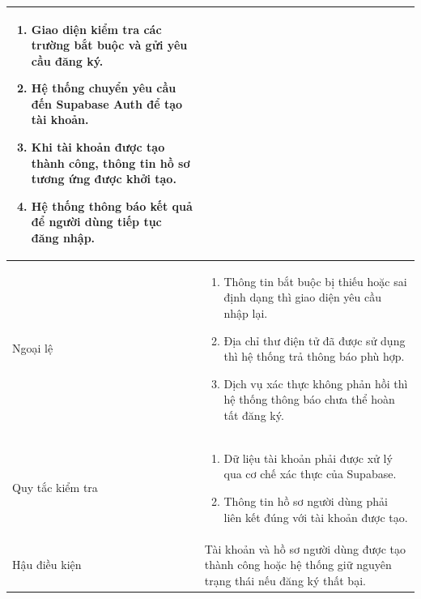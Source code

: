 \documentclass[12pt,a4paper,oneside]{report}
\begin{document}
{\begin{longtable}{|L{3.6cm}|L{11.2cm}|}
\begin{enumerate}[leftmargin=*,nosep]
                            \item Giao diện kiểm tra các trường bắt buộc và gửi yêu cầu đăng ký.
                            \item Hệ thống chuyển yêu cầu đến Supabase Auth để tạo tài khoản.
                            \item Khi tài khoản được tạo thành công, thông tin hồ sơ tương ứng được khởi tạo.
                            \item Hệ thống thông báo kết quả để người dùng tiếp tục đăng nhập.
                          \end{enumerate}                                                    \\
    \hline
    Ngoại lệ            & \begin{enumerate}[leftmargin=*,nosep]
                            \item Thông tin bắt buộc bị thiếu hoặc sai định dạng thì giao diện yêu cầu nhập lại.
                            \item Địa chỉ thư điện tử đã được sử dụng thì hệ thống trả thông báo phù hợp.
                            \item Dịch vụ xác thực không phản hồi thì hệ thống thông báo chưa thể hoàn tất đăng ký.
                          \end{enumerate}                                              \\
    \hline
    Quy tắc kiểm tra    & \begin{enumerate}[leftmargin=*,nosep]
                            \item Dữ liệu tài khoản phải được xử lý qua cơ chế xác thực của Supabase.
                            \item Thông tin hồ sơ người dùng phải liên kết đúng với tài khoản được tạo.
                          \end{enumerate}                                                          \\
    \hline
    Hậu điều kiện       & Tài khoản và hồ sơ người dùng được tạo thành công hoặc hệ thống giữ nguyên trạng thái nếu đăng ký thất bại.                         \\
    \hline
  \end{longtable}
}
\end{document}

